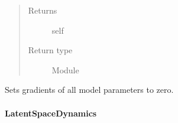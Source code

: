 \documentclass[letterpaper,10pt,english]{sphinxmanual}
\begin{document}
\begin{fulllineitems}
\begin{fulllineitems}
\begin{quote}
\begin{description}
\item[{Returns}] \leavevmode
self

\item[{Return type}] \leavevmode
Module

\end{description}\end{quote}

\end{fulllineitems}


\begin{fulllineitems}
\label{\detokenize{api/dynamics:geology.metamodelling.dynamics.NeuralDifferentialEquation.zero_grad}}
Sets gradients of all model parameters to zero.

\end{fulllineitems}


\end{fulllineitems}



\paragraph{LatentSpaceDynamics}
\label{\detokenize{api/dynamics:latentspacedynamics}}
\end{document}
